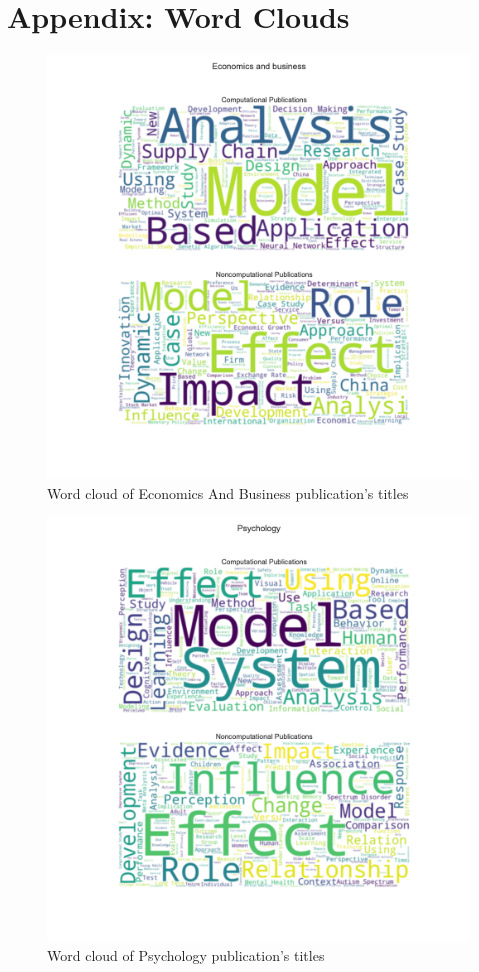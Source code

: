 \documentclass[12pt, a4paper]{article}
\begin{document}
\section{Appendix: Word Clouds}\label{appendix}
\begin{figure}[H]
	\centering
	\includegraphics[width=\textwidth]{wc_Economics_And_Business}
	\caption{Word cloud of Economics And Business publication's titles}
\end{figure}
\begin{figure}[H]
	\centering
	\includegraphics[width=\textwidth]{wc_Psychology}
	\caption{Word cloud of Psychology publication's titles}
\end{figure}
\end{document}
